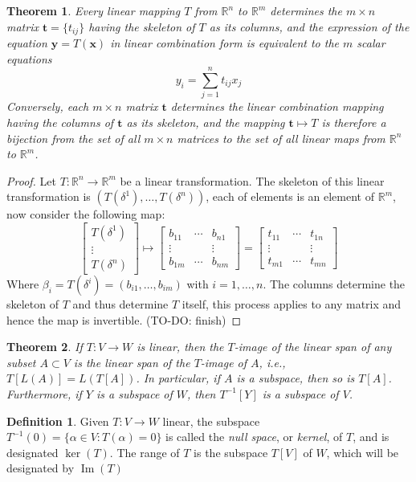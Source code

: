\documentclass[12pt]{article}
\newcommand{\RR}{\mathbb{R}}
\newtheorem{theorem}{Theorem}[section]             \newtheorem{corollary}{Corollary}[theorem]
\theoremstyle{definition}
\newtheorem{definition}{Definition}[section]
\DeclareMathOperator{\Ima}{Im}
\begin{document}
	\begin{theorem}
		Every linear mapping $T$ from $\RR^n$ to $\RR^m$ determines the $m \times n$ matrix $\bm t = \{t_{ij} \}$ having the skeleton of $T$ as its columns, and the expression of the equation $\bm y = T(\bm x)$ in linear combination form is equivalent to the $m$ scalar equations
		\[
			y_i = \sum_{j = 1}^n t_{ij}x_j
		\]
		Conversely, each $m \times n$ matrix $\bm t$ determines the linear combination mapping having the columns of $\bm t$ as its skeleton, and the mapping $\bm t \mapsto T$ is therefore a bijection from the set of all $m \times n$ matrices to the set of all linear maps from $\RR^n$ to $\RR^m$.
	\end{theorem}
	\begin{proof}
		Let $T : \RR^n \to \RR^m$ be a linear transformation. The skeleton of this linear transformation is $(T(\delta^1), \ldots, T(\delta^n))$, each of elements is an element of $\RR^m$, now consider the following map: 
		\[
		\begin{bmatrix}
			T(\delta^1) \\
			\vdots \\
			T(\delta^n)
		\end{bmatrix} \mapsto
		\begin{bmatrix}
			b_{11} & \cdots & b_{n1} \\
			\vdots & & \vdots \\
			b_{1m} & \cdots & b_{nm}	
		\end{bmatrix}
		=
		\begin{bmatrix}
			t_{11} & \cdots & t_{1n} \\
			\vdots & & \vdots \\
			t_{m1} & \cdots & t_{mn}
		\end{bmatrix}
	\]
	Where $ \beta_i = T(\delta^i) = (b_{i1}, \ldots, b_{im})$ with $i = 1, \ldots, n$. The columns determine the skeleton of $T$ and thus determine $T$ itself, this process applies to any matrix and hence the map is invertible. (TO-DO: finish) 
	\end{proof}
	\begin{theorem}
		If $T: V \to W$ is linear, then the $T$-image of the linear span of any subset $A \subset V$ is the linear span of the $T$-image of $A$, i.e., $ T[L(A)] = L(T[A])$. In particular, if $A$ is a subspace, then so is $T[A]$. Furthermore, if $Y$ is a subspace of $W$, then $T^{-1}[Y]$ is a subspace of $V$.
	\end{theorem}
	\begin{definition}
		Given $T : V \to W$ linear, the subspace $T^{-1}(0) = \{ \alpha \in V : T(\alpha) = 0\}$ is called the \textit{null space}, or \textit{kernel}, of $T$, and is designated $\ker(T)$. The range of $T$ is the subspace $T[V]$ of $W$, which will be designated by $\Ima(T)$ 
	\end{definition}
\end{document}
